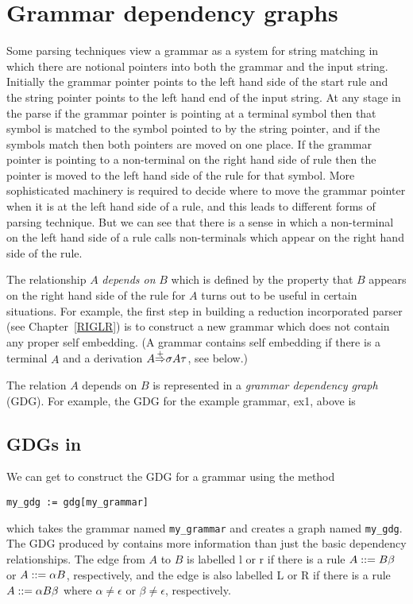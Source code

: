 \section{Grammar dependency graphs}\label{gdg}

Some parsing techniques view a grammar as a system for string matching
in which there are notional pointers into both the grammar and the
input string. Initially the grammar pointer points to the left hand
side of the start rule and the string pointer points to the left hand
end of the input string. At any stage in the parse if the grammar
pointer is pointing at a terminal symbol then that symbol is matched
to the symbol pointed to by the string pointer, and if the symbols
match then both pointers are moved on one place. If the grammar
pointer is pointing to a non-terminal on the right hand side of rule
then the pointer is moved to the left hand side of the rule for that
symbol. More sophisticated machinery is required to decide where to
move the grammar pointer when it is at the left hand side of a rule, 
and this leads to
different forms of parsing technique. But we can see that there is a
sense in which a non-terminal on the left hand side of a rule calls
non-terminals which appear on the right hand side of the rule.

The relationship $A$ {\em depends on} $B$ which is defined by the
property that $B$ appears on the right hand side of the rule for $A$
turns out to be useful in certain situations. For example, the first
step in building a reduction incorporated parser (see Chapter~\ref{RIGLR})
is to construct a new grammar which does not contain any proper self
embedding. (A grammar contains self embedding if there is a terminal $A$
and a derivation $A{\mathop{\Rightarrow}\limits^{+}}\sigma A\tau$, see below.)

The relation $A$ depends on $B$ is represented in a {\em grammar
dependency graph} (GDG). For example, the GDG for the example
grammar, ex1, above is

\begin{center}
{\footnotesize

}
\end{center}

\subsection{GDGs in \gtbs}
We can get \gtb to construct the GDG for a grammar using the method

\begin{center}\label{p_gdg}
\verb&my_gdg := gdg[my_grammar]&
\end{center}
which takes the grammar named
\verb&my_grammar& and creates a graph named \verb&my_gdg&.
The GDG produced by \gtb contains more information than just the basic
dependency relationships. The edge from $A$ to $B$ is labelled l or r
if there is a rule $A::= B\beta$ or $A::= \alpha B$, respectively,
and the edge is also labelled L or R
if there is a rule $A::= \alpha B\beta$ where $\alpha \not=\epsilon$
or $\beta\not=\epsilon$, respectively.

